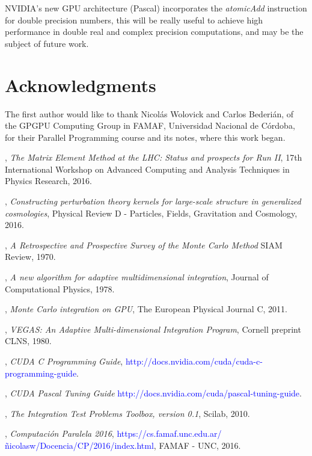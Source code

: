 \documentclass[english]{maciarticle}
\begin{document}
NVIDIA's new GPU architecture (Pascal) incorporates the \textit{atomicAdd} instruction for double precision numbers\cite{pascal}, this will be really useful to achieve high performance in double real and complex precision computations, and may be the subject of future work. 

\section*{Acknowledgments}
The first author would like to thank Nicol\'as Wolovick and Carlos Bederi\'an, of the
GPGPU Computing Group in FAMAF, Universidad Nacional de C\'ordoba, for their Parallel Programming course and its notes\cite{cp2016}, where this work began.


\begin{thebibliography}{1}
 {},
\emph{The Matrix Element Method at the LHC: Status and prospects for Run II},
17th International Workshop on Advanced Computing and Analysis Techniques in Physics Research, 2016.

 {},
\emph{Constructing perturbation theory kernels for large-scale structure in generalized cosmologies},
Physical Review D - Particles, Fields, Gravitation and Cosmology, 2016.

 {},
\emph{A Retrospective and Prospective Survey of the Monte Carlo Method}
SIAM Review, 1970.

 {},
\emph{A new algorithm for adaptive multidimensional integration},
Journal of Computational Physics, 1978.

 {},
{\em Monte Carlo integration on GPU},
The European Physical Journal C, 2011.

 {},
{\em VEGAS: An Adaptive Multi-dimensional Integration Program},
Cornell preprint CLNS, 1980.

 {}, {\em CUDA C Programming Guide},
\textcolor{blue}{http://docs.nvidia.com/cuda/cuda-c-programming-guide}.

 {}, {\em CUDA Pascal Tuning Guide} \textcolor{blue}{http://docs.nvidia.com/cuda/pascal-tuning-guide}.

 {},
\emph{The Integration Test Problems Toolbox, version 0.1},
Scilab, 2010.

 {},
{\em Computaci\'on Paralela 2016}, \textcolor{blue}{https://cs.famaf.unc.edu.ar/\~nicolasw/Docencia/CP/2016/index.html},
FAMAF - UNC, 2016.
\end{thebibliography}
\end{document}
